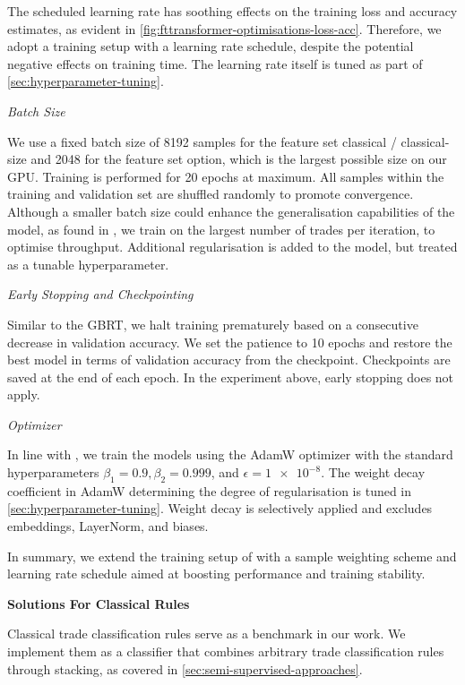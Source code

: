The scheduled learning rate has soothing effects on the training loss and accuracy estimates, as evident in \cref{fig:fttransformer-optimisations-loss-acc}. Therefore, we adopt a training setup with a learning rate schedule, despite the potential negative effects on training time. The learning rate itself is tuned as part of \cref{sec:hyperparameter-tuning}.


\emph{Batch Size}

We use a fixed batch size of \num{8192} samples for the feature set classical / classical-size and \num{2048} for the feature set option, which is the largest possible size on our \gls{GPU}. Training is performed for \num{20} epochs at maximum. All samples within the training and validation set are shuffled randomly to promote convergence. Although a smaller batch size could enhance the generalisation capabilities of the model, as found in \textcite[][3]{keskarLargeBatchTrainingDeep2017}, we train on the largest number of trades per iteration, to optimise throughput. Additional regularisation is added to the model, but treated as a tunable hyperparameter.

\emph{Early Stopping and Checkpointing}

Similar to the \gls{GBRT}, we halt training prematurely based on a consecutive decrease in validation accuracy. We set the patience to \num{10} epochs and restore the best model in terms of validation accuracy from the checkpoint. Checkpoints are saved at the end of each epoch. In the experiment above, early stopping does not apply.

\emph{Optimizer}

In line with \textcite[][6]{gorishniyRevisitingDeepLearning2021}, we train the models using the AdamW optimizer \autocite[][2--3]{loshchilovDecoupledWeightDecay2019} with the standard hyperparameters $\beta_{1}=0.9, \beta_{2}=0.999$, and $\epsilon = \num{1e-8}$. The weight decay coefficient in AdamW determining the degree of regularisation is tuned in \cref{sec:hyperparameter-tuning}. Weight decay is selectively applied and excludes embeddings, LayerNorm, and biases.

In summary, we extend the training setup of \textcite[][6]{gorishniyRevisitingDeepLearning2021} with a sample weighting scheme and learning rate schedule aimed at boosting performance and training stability.

\textbf{Solutions For Classical Rules}

Classical trade classification rules serve as a benchmark in our work. We implement them as a classifier that combines arbitrary trade classification rules through stacking, as covered in \cref{sec:semi-supervised-approaches}.

